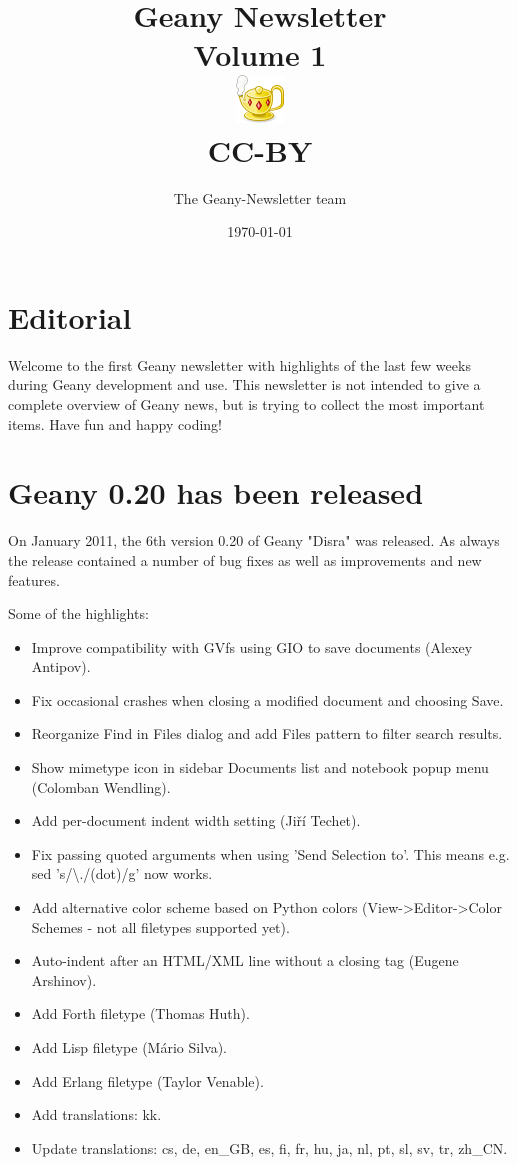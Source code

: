 \documentclass[%
paper=a4,%
fontsize=12pt,%
twoside=false,%
DIV18,
headsepline,
plainheadsepline,
footsepline,
plainfootsepline,
parskip=half,%
openany,%
]{scrartcl}
\title{Geany Newsletter \\[1ex]
	\small{Volume 1} \\[1ex]
	\includegraphics{img/geany.png} \\[1.5ex]
	CC-BY}
\author{The Geany-Newsletter team}
\date{\today}
\begin{document}
\maketitle{}

\tableofcontents{}

\newpage{}

\section*{Editorial}

Welcome to the first Geany newsletter with highlights of the last few weeks
during Geany development and use. This newsletter is not intended to give a complete
overview of Geany news, but is trying to collect the most important items.
Have fun and happy coding!


\section{Geany 0.20 has been released}

On January 2011, the 6th version 0.20 of Geany "Disra" was released. As always
the release contained a number of bug fixes as well as improvements and new features.

Some of the highlights:

\begin{itemize}
	\item Improve compatibility with GVfs using GIO to save documents (Alexey Antipov).
	\item Fix occasional crashes when closing a modified document and choosing Save.
	\item Reorganize Find in Files dialog and add Files pattern to filter search results.
	\item Show mimetype icon in sidebar Documents list and notebook popup menu (Colomban Wendling).
	\item Add per-document indent width setting (Jiří Techet).
	\item Fix passing quoted arguments when using 'Send Selection to'. This means e.g. sed 's/\textbackslash{}./(dot)/g' now works.
	\item Add alternative color scheme based on Python colors (View->Editor->Color Schemes - not all filetypes supported yet).
	\item Auto-indent after an HTML/XML line without a closing tag (Eugene Arshinov).
	\item Add Forth filetype (Thomas Huth).
	\item Add Lisp filetype (Mário Silva).
	\item Add Erlang filetype (Taylor Venable).
	\item Add translations: kk.
	\item Update translations: cs, de, en\_GB, es, fi, fr, hu, ja, nl, pt, sl, sv, tr, zh\_CN.
\end{itemize}
\end{document}
